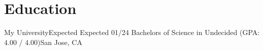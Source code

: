 \section{Education}
    \resumeSubHeadingListStart

    \resumeSubheading
    {My University}{Expected Expected 01/24}
    {Bachelors of Science in Undecided (GPA: 4.00 / 4.00)}{San Jose, CA}
    \resumeItemListStart

    \resumeSubHeadingListEnd